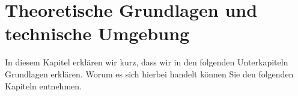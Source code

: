 \chapter{Theoretische Grundlagen und technische Umgebung}\label{c:Grundlagen}

In diesem Kapitel erklären wir kurz, dass wir in den folgenden Unterkapiteln Grundlagen erklären. Worum es sich hierbei handelt können Sie den folgenden Kapiteln entnehmen.





